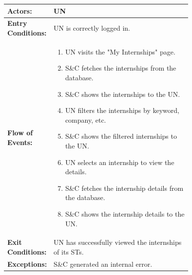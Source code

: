 \begin{center}
    \begin{longtable}{|l|p{0.75\linewidth}|}
        \hline
        \textbf{Actors:}           & UN                                                          \\
        \hline
        \textbf{Entry Conditions:} & UN is correctly logged in.                                  \\
        \hline
        \textbf{Flow of Events:}   & \begin{enumerate}
                                         \item UN visits the "My Internships" page.
                                         \item S\&C fetches the internships from the database.
                                         \item S\&C shows the internships to the UN.
                                         \item UN filters the internships by keyword, company, etc.
                                         \item S\&C shows the filtered internships to the UN.
                                         \item UN selects an internship to view the details.
                                         \item S\&C fetches the internship details from the database.
                                         \item S\&C shows the internship details to the UN.
                                     \end{enumerate} \\
        \hline
        \textbf{Exit Conditions:}  & UN has successfully viewed the internships of its STs.      \\
        \hline
        \textbf{Exceptions:}       & S\&C generated an internal error.                           \\
        \hline
    \end{longtable}
\end{center}

